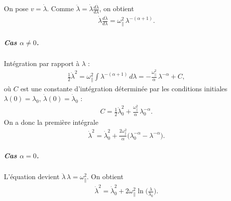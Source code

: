 On pose \(v=\dot\lambda\). Comme \(\ddot\lambda=\dot\lambda\frac{d\dot\lambda}{d\lambda}\), on obtient
\begin{eqnarray}
	\dot\lambda\frac{d\dot\lambda}{d\lambda}=\omega_\parallel^2\,\lambda^{-(\alpha+1)}.
\end{eqnarray}

\subparagraph{Cas \(\alpha\neq0\).}
Intégration par rapport à \(\lambda\) :
\begin{eqnarray}
\frac{1}{2}\dot\lambda^2
= \omega_\parallel^2\int \lambda^{-(\alpha+1)}\,d\lambda
= -\frac{\omega_\parallel^2}{\alpha}\,\lambda^{-\alpha} + C,
\end{eqnarray}
où \(C\) est une constante d'intégration déterminée par les conditions initiales \(\lambda(0)=\lambda_0\), \(\dot\lambda(0)=\dot\lambda_0\) :
\begin{eqnarray}
C=\frac{1}{2}\dot\lambda_0^2+\frac{\omega_\parallel^2}{\alpha}\,\lambda_0^{-\alpha}.
\end{eqnarray}
On a donc la première intégrale
\begin{eqnarray}
\dot\lambda^2
= \dot\lambda_0^2 + \frac{2\omega_\parallel^2}{\alpha}\big(\lambda_0^{-\alpha}-\lambda^{-\alpha}\big).
\end{eqnarray}

\subparagraph{Cas \(\alpha=0\).}
L'équation devient \(\ddot\lambda\,\lambda=\omega_\parallel^2\). On obtient
\begin{eqnarray}
\dot\lambda^2 = \dot\lambda_0^2 + 2\omega_\parallel^2\ln\!\big(\tfrac{\lambda}{\lambda_0}\big).
\end{eqnarray}




